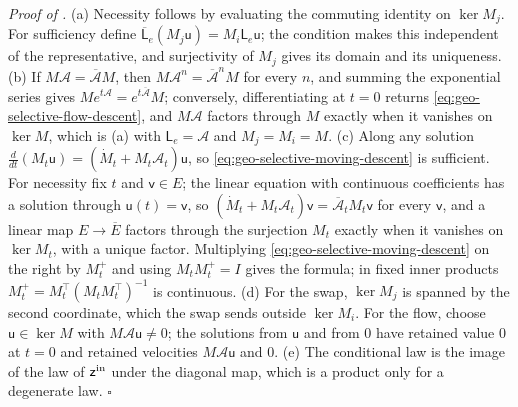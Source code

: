 \noindent\emph{Proof of .}
(a) Necessity follows by evaluating the commuting identity on \(\ker M_j\). For
sufficiency define \(\overline{\mathsf L}_e(M_j\mathsf u)=M_i\mathsf L_e\mathsf u\);
the condition makes this independent of the representative, and surjectivity
of \(M_j\) gives its domain and its uniqueness. (b) If
\(M\mathcal A=\overline{\mathcal A}M\), then
\(M\mathcal A^n=\overline{\mathcal A}^nM\) for every \(n\), and summing the
exponential series gives \(Me^{t\mathcal A}=e^{t\overline{\mathcal A}}M\);
conversely, differentiating at \(t=0\) returns
\eqref{eq:geo-selective-flow-descent}, and \(M\mathcal A\) factors through
\(M\) exactly when it vanishes on \(\ker M\), which is (a) with
\(\mathsf L_e=\mathcal A\) and \(M_j=M_i=M\). (c) Along any solution
\(\tfrac{d}{dt}(M_t\mathsf u)=(\dot M_t+M_t\mathcal A_t)\mathsf u\), so
\eqref{eq:geo-selective-moving-descent} is sufficient. For necessity fix \(t\)
and \(\mathsf v\in E\); the linear equation with continuous coefficients has a
solution through \(\mathsf u(t)=\mathsf v\), so
\((\dot M_t+M_t\mathcal A_t)\mathsf v=\overline{\mathcal A}_tM_t\mathsf v\) for
every \(\mathsf v\), and a linear map \(E\to\overline E\) factors through the
surjection \(M_t\) exactly when it vanishes on \(\ker M_t\), with a unique
factor. Multiplying \eqref{eq:geo-selective-moving-descent} on the right by
\(M_t^+\) and using \(M_tM_t^+=I\) gives the formula; in fixed inner products
\(M_t^+=M_t^\top(M_tM_t^\top)^{-1}\) is continuous. (d) For the swap,
\(\ker M_j\) is spanned by the second coordinate, which the swap sends outside
\(\ker M_i\). For the flow, choose \(\mathsf u\in\ker M\) with
\(M\mathcal A\mathsf u\ne0\); the solutions from \(\mathsf u\) and from \(0\)
have retained value \(0\) at \(t=0\) and retained velocities
\(M\mathcal A\mathsf u\) and \(0\). (e) The conditional law is the image of the
law of \(\mathsf z^{\rm in}\) under the diagonal map, which is a product only
for a degenerate law. \(\square\)
